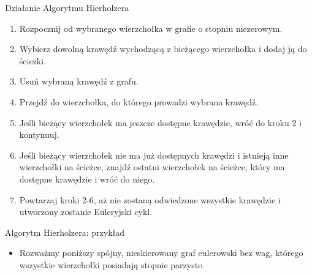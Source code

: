 \documentclass[polish,envcountsect,10pt]{beamer}
\begin{document}
\begin{frame}{Działanie Algorytmu Hierholzera}
    \begin{enumerate}
        \item Rozpocznij od wybranego wierzchołka w grafie o stopniu niezerowym.
        \item Wybierz dowolną krawędź wychodzącą z bieżącego wierzchołka i dodaj ją do ścieżki.
        \item Usuń wybraną krawędź z grafu.
        \item Przejdź do wierzchołka, do którego prowadzi wybrana krawędź.
        \item Jeśli bieżący wierzchołek ma jeszcze dostępne krawędzie, wróć do kroku 2 i kontynuuj.
        \item Jeśli bieżący wierzchołek nie ma już dostępnych krawędzi i istnieją inne wierzchołki na ścieżce, znajdź ostatni wierzchołek na ścieżce, który ma dostępne krawędzie i wróć do niego.
        \item Powtarzaj kroki 2-6, aż nie zostaną odwiedzone wszystkie krawędzie i utworzony zostanie Euleryjski cykl.
    \end{enumerate}
\end{frame}

\begin{frame}{Algorytm Hierholzera: przykład}
    \begin{itemize}
        \item Rozważmy poniższy spójny, nieskierowany graf eulerowski bez wag, którego wszystkie wierzchołki posiadają stopnie parzyste.
    \end{itemize}
    \begin{center}
    \end{center}
\end{frame}
\end{document}
